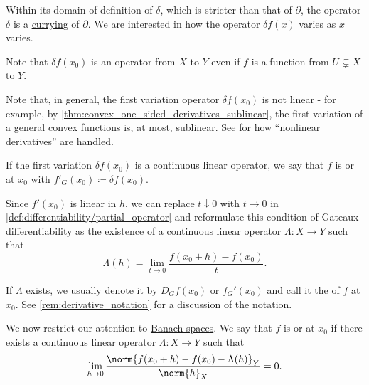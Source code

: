 \begin{definition}
\begin{thmenum}
    Within its domain of definition of \( \delta \), which is stricter than that of \( \partial \), the operator \( \delta \) is a \hyperref[con:currying]{currying} of \( \partial \). We are interested in how the operator \( \delta f(x) \) varies as \( x \) varies.

    Note that \( \delta f(x_0) \) is an operator from \( X \) to \( Y \) even if \( f \) is a function from \( U \subsetneq X \) to \( Y \).

    Note that, in general, the first variation operator \( \delta f(x_0) \) is not linear - for example, by \cref{thm:convex_one_sided_derivatives_sublinear}, the first variation of a general convex functions is, at most, sublinear. See  for how \enquote{nonlinear derivatives} are handled.

    If the first variation \( \delta f(x_0) \) is a continuous linear operator, we say that \( f \) is  or  at \( x_0 \) with  \( f'_G(x_0) \coloneqq \delta f(x_0) \).

    Since \( f'(x_0) \) is linear in \( h \), we can replace \( t \downarrow 0 \) with \( t \to 0 \) in \cref{def:differentiability/partial_operator} and reformulate this condition of Gateaux differentiability as the existence of a continuous linear operator \( \Lambda: X \to Y \) such that
    \begin{equation}\label{def:differentiability/gateaux/condition}
      \Lambda(h) = \lim_{t \to 0} \frac {f(x_0 + h) - f(x_0)} t.
    \end{equation}

    If \( \Lambda \) exists, we usually denote it by \( D_G f(x_0) \) or \( f_G'(x_0) \) and call it the  of \( f \) at \( x_0 \). See \cref{rem:derivative_notation} for a discussion of the notation.

    We now restrict our attention to \hyperref[def:banach_space]{Banach spaces}. We say that \( f \) is  or  at \( x_0 \) if there exists a continuous linear operator \( \Lambda: X \to Y \) such that
    \begin{equation}\label{def:differentiability/frechet/condition}
      \lim_{h \to 0} \frac {\norm{f(x_0 + h) - f(x_0) - \Lambda(h)}_Y} {\norm{h}_X} = 0.
    \end{equation}


\end{thmenum}
\end{definition}

